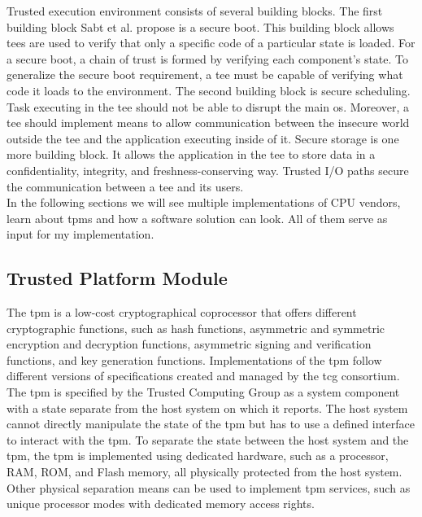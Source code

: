 Trusted execution environment consists of several building blocks. The first
building block Sabt et al. propose is a secure boot. This building block allows
\glspl{tee} are used to verify that only a specific code of a particular state
is loaded. For a secure boot, a chain of trust is formed by verifying each
component's state. To generalize the secure boot requirement, a \gls{tee} must
be capable of verifying what code it loads to the environment. The second
building block is secure scheduling. Task executing in the \gls{tee} should not
be able to disrupt the main \gls{os}. Moreover, a \gls{tee} should implement
means to allow communication between the insecure world outside the \gls{tee}
and the application executing inside of it. Secure storage is one more building
block. It allows the application in the \gls{tee} to store data in a
confidentiality, integrity, and freshness-conserving way. Trusted I/O paths
secure the communication between a \gls{tee} and its users.\\

In the following sections we will see multiple implementations of CPU vendors,
learn about \glspl{tpm} and how a software solution can look. All of them serve
as input for my implementation.

\subsection{Trusted Platform Module}
\label{sec:20:tpm}
The \gls{tpm} is a low-cost cryptographical coprocessor that offers different
cryptographic functions, such as hash functions, asymmetric and symmetric
encryption and decryption functions, asymmetric signing and verification
functions, and key generation functions. Implementations of the \gls{tpm} follow
different versions of specifications created and managed by the \gls{tcg}
consortium.\cite{tpm_architecture} The \gls{tpm} is specified by the Trusted
Computing Group as a system component with a state separate from the host system
on which it reports. The host system cannot directly manipulate the state of the
\gls{tpm} but has to use a defined interface to interact with the \gls{tpm}. To
separate the state between the host system and the \gls{tpm}, the \gls{tpm} is
implemented using dedicated hardware, such as a processor, RAM, ROM, and Flash
memory, all physically protected from the host system. Other physical separation
means can be used to implement \gls{tpm} services, such as unique processor
modes with dedicated memory access rights.\\

